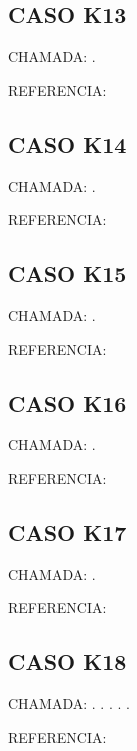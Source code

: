 \documentclass{undftex}
\begin{document}
\begin{refsection}\section*{CASO K13} CHAMADA: . \textcite{k13}\par REFERENCIA:\par\printbibliography[heading=none,check=undfconsultadas]\end{refsection}\clearpage
\begin{refsection}\section*{CASO K14} CHAMADA: . \textcite{k14}\par REFERENCIA:\par\printbibliography[heading=none,check=undfconsultadas]\end{refsection}\clearpage
\begin{refsection}\section*{CASO K15} CHAMADA: . \textcite{k15}\par REFERENCIA:\par\printbibliography[heading=none,check=undfconsultadas]\end{refsection}\clearpage
\begin{refsection}\section*{CASO K16} CHAMADA: . \textcite{k16}\par REFERENCIA:\par\printbibliography[heading=none,check=undfconsultadas]\end{refsection}\clearpage
\begin{refsection}\section*{CASO K17} CHAMADA: . \textcite{k17}\par REFERENCIA:\par\printbibliography[heading=none,check=undfconsultadas]\end{refsection}\clearpage
\begin{refsection}\section*{CASO K18} CHAMADA: . \textcite{k18b}. . . . \par REFERENCIA:\par\printbibliography[heading=none,check=undfconsultadas]\end{refsection}\clearpage
\end{document}
